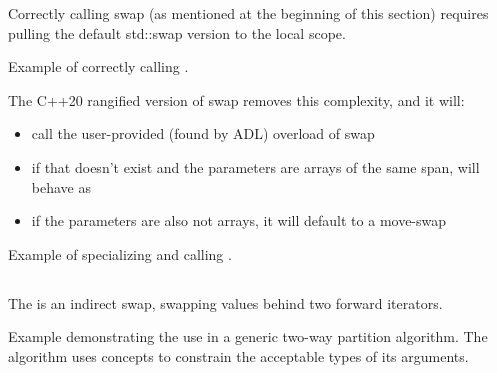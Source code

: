 
Correctly calling swap (as mentioned at the beginning of this section) requires pulling the default std::swap version to the local scope.

\begin{box-note}
\footnotesize Example of correctly calling .
\tcblower
{}
\end{box-note}
\newpage

The C++20 rangified version of swap removes this complexity, and it will:

\begin{itemize}
    \item call the user-provided (found by ADL) overload of swap
    \item if that doesn't exist and the parameters are arrays of the same span,  will behave as 
    \item if the parameters are also not arrays, it will default to a move-swap
\end{itemize}

\begin{box-note}
\footnotesize Example of specializing and calling .
\tcblower
{}
\end{box-note}

\subsection{\texorpdfstring{}{\texttt{std::iter\_swap}}}

The  is an indirect swap, swapping values behind two forward iterators.



\begin{box-note}
\footnotesize Example demonstrating the use  in a generic two-way partition algorithm. The algorithm uses concepts to constrain the acceptable types of its arguments.
\tcblower
{}
\end{box-note}

